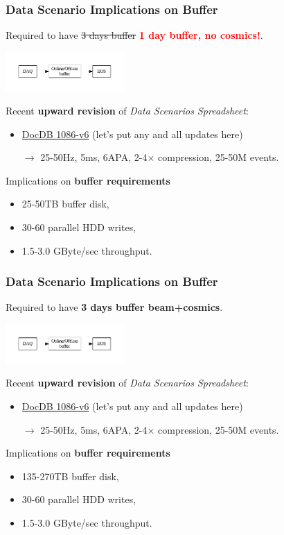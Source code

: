 \documentclass[xcolor=dvipsnames]{beamer}
\begin{document}
\begin{frame}
  \frametitle{Data Scenario Implications on Buffer}

  Required to have \sout{3 days buffer} \textbf{\textcolor{red}{1 day buffer, no cosmics!}}.

  \begin{center}
    \includegraphics[height=1.5cm,clip,trim=0 10mm 0 10mm]{figures/big-picture.pdf}
  \end{center}

  Recent \textbf{upward revision} of \textit{Data Scenarios Spreadsheet}:
  \begin{itemize}
  \item \href{http://docs.dunescience.org:8080/cgi-bin/ShowDocument?docid=1086}{DocDB 1086-v6} (let's put any and all updates here)
  \item[$\rightarrow$] 25-50Hz, 5ms, 6APA, 2-4$\times$ compression, 25-50M events.
  \end{itemize}
  Implications on \textbf{buffer requirements}
  \begin{itemize}
  \item 25-50TB buffer disk, 
  \item 30-60 parallel HDD writes, 
  \item 1.5-3.0 GByte/sec throughput.
  \end{itemize}
\end{frame}

\begin{frame}
  \frametitle{Data Scenario Implications on Buffer}

  Required to have \textbf{3 days buffer beam+cosmics}.

  \begin{center}
    \includegraphics[height=1.5cm,clip,trim=0 10mm 0 10mm]{figures/big-picture.pdf}
  \end{center}

  Recent \textbf{upward revision} of \textit{Data Scenarios Spreadsheet}:
  \begin{itemize}
  \item \href{http://docs.dunescience.org:8080/cgi-bin/ShowDocument?docid=1086}{DocDB 1086-v6} (let's put any and all updates here)
  \item[$\rightarrow$] 25-50Hz, 5ms, 6APA, 2-4$\times$ compression, 25-50M events.
  \end{itemize}
  Implications on \textbf{buffer requirements}
  \begin{itemize}
  \item 135-270TB buffer disk, 
  \item 30-60 parallel HDD writes, 
  \item 1.5-3.0 GByte/sec throughput.
  \end{itemize}
\end{frame}
\end{document}
